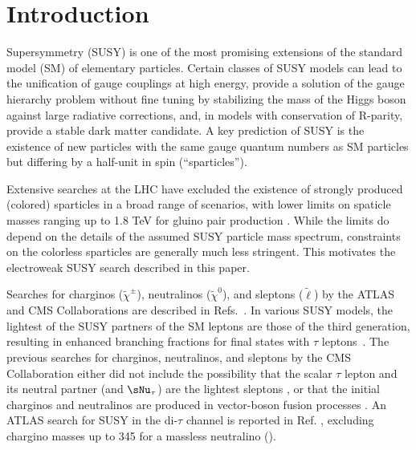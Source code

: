 \section{Introduction}
\label{sect:introduction}

Supersymmetry (SUSY) \cite{Golfand:1971iw,Wess:1973kz,Wess:1974tw,Fayet1,Fayet2} is one of the most promising extensions of the 
standard model (SM) of elementary particles.  
Certain classes of SUSY models can lead to the unification of gauge couplings at high energy, 
provide a solution of the gauge hierarchy problem without fine tuning by stabilizing the mass of the Higgs boson 
against large radiative corrections, and, in models with conservation of R-parity, provide a stable dark matter candidate.
A key prediction of SUSY is the existence of new particles with the same gauge quantum numbers as SM particles but
differing by a half-unit in spin (``sparticles'').


Extensive searches at the LHC have excluded the existence of strongly produced (colored) sparticles in a broad range of scenarios, 
with lower limits on spaticle masses ranging up to 1.8 TeV for gluino pair production 
\cite{Chatrchyan:2013fea,Chatrchyan:2013mys,Chatrchyan:2014aea,Chatrchyan:2014lfa,Khachatryan:2015vra,Khachatryan:2015lwa,Aad:2015pfx,Aad:2015iea}. 
While the limits do depend on the details of the assumed SUSY particle mass spectrum, 
constraints on the colorless sparticles are generally much less stringent.
This motivates the electroweak SUSY search described in this paper.


Searches for charginos ($\widetilde{\chi}^{\pm}\xspace$), neutralinos ($\widetilde{\chi}^{0}\xspace$), and sleptons ($\widetilde{\ell}\xspace$) by the ATLAS and CMS Collaborations are described in Refs.~\cite{Aad:2014nua,Aad:2014vma,Khachatryan:2014qwa,Khachatryan:2014mma,Khachatryan:2015kxa}.
In various SUSY models, the lightest of the SUSY partners of the SM leptons are those of the third generation, 
resulting in enhanced branching fractions for final states with $\tau$ leptons~\cite{Martin:1997ns}.  
The previous searches for charginos, neutralinos, and sleptons by the CMS Collaboration  either did not include the possibility that 
the scalar $\tau$ lepton and its neutral partner (\stau and $\sNu_\tau$) 
are the lightest sleptons \cite{Khachatryan:2014qwa}, or that the initial charginos and neutralinos are produced in vector-boson fusion processes \cite{Khachatryan:2015kxa}. An ATLAS search for SUSY in the di-$\tau$ channel is reported in Ref. \cite{Aad:2014yka}, excluding chargino masses up to 345 \GeV 
for a massless neutralino (\PSGczDo).

